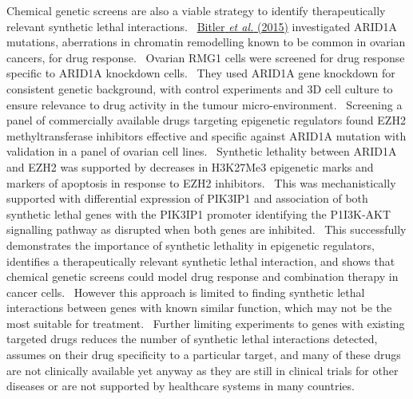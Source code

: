 Chemical genetic screens are also a viable strategy to identify
therapeutically relevant synthetic lethal interactions.
\ \hyperlink{ENREF13}{Bitler}\hyperlink{ENREF13}{\textit{ et
al.}}\hyperlink{ENREF13}{ (2015)} investigated ARID1A mutations,
aberrations in chromatin remodelling known to be common in ovarian
cancers, for drug response. \ Ovarian RMG1 cells were screened for drug
response specific to ARID1A knockdown cells. \ They used ARID1A gene
knockdown for consistent genetic background, with control experiments
and 3D cell culture to ensure relevance to drug activity in the tumour
micro-environment. \ Screening a panel of commercially available drugs
targeting epigenetic regulators found EZH2 methyltransferase inhibitors
effective and specific against ARID1A mutation with validation in a
panel of ovarian cell lines. \ Synthetic lethality between ARID1A and
EZH2 was supported by decreases in H3K27Me3 epigenetic marks and
markers of apoptosis in response to EZH2 inhibitors. \ This was
mechanistically supported with differential expression of PIK3IP1 and
association of both synthetic lethal genes with the PIK3IP1 promoter
identifying the P1I3K-AKT signalling pathway as disrupted when both
genes are inhibited. \ This successfully demonstrates the importance of
synthetic lethality in epigenetic regulators, identifies a
therapeutically relevant synthetic lethal interaction, and shows that
chemical genetic screens could model drug response and combination
therapy in cancer cells. \ However this approach is limited to finding
synthetic lethal interactions between genes with known similar
function, which may not be the most suitable for treatment. \ Further
limiting experiments to genes with existing targeted drugs reduces the
number of synthetic lethal interactions detected, assumes on their drug
specificity to a particular target, and many of these drugs are not
clinically available yet anyway as they are still in clinical trials
for other diseases or are not supported by healthcare systems in many
countries. \ 


